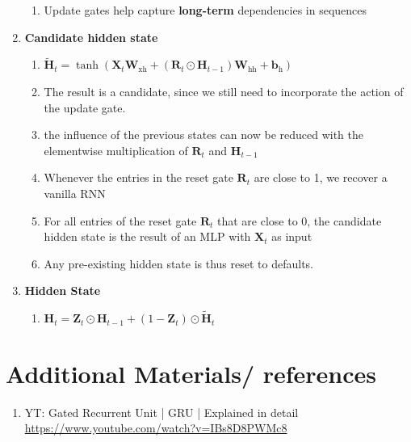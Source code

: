 \begin{enumerate}[itemsep=0.15cm]
\begin{enumerate}
        \item Update gates help capture \textbf{long-term} dependencies in sequences
    \end{enumerate}

    \item \textbf{Candidate hidden state}
    \begin{enumerate}
        \item $\tilde{\mathbf{H}}_t = \tanh(\mathbf{X}_t \mathbf{W}_{\textrm{xh}} + \left(\mathbf{R}_t \odot \mathbf{H}_{t-1}\right) \mathbf{W}_{\textrm{hh}} + \mathbf{b}_\textrm{h})$

        \item The result is a candidate, since we still need to incorporate the action of the update gate.

        \item the influence of the previous states can now be reduced with the elementwise multiplication of $\mathbf{R}_t$ and $\mathbf{H}_{t-1}$

        \item Whenever the entries in the reset gate $\mathbf{R}_t$ are close to 1, we recover a vanilla RNN

        \item For all entries of the reset gate $\mathbf{R}_t$ that are close to 0, the candidate hidden state is the result of an MLP with $\mathbf{X}_t$ as input

        \item Any pre-existing hidden state is thus reset to defaults.
    \end{enumerate}

    \item \textbf{Hidden State}
    \begin{enumerate}
        \item $\mathbf{H}_t = \mathbf{Z}_t \odot \mathbf{H}_{t-1}  + (1 - \mathbf{Z}_t) \odot \tilde{\mathbf{H}}_t$

    \end{enumerate}
\end{enumerate}











\section*{Additional Materials/ references}
\begin{enumerate}
    \item YT: Gated Recurrent Unit | GRU | Explained in detail\\
    \url{https://www.youtube.com/watch?v=IBs8D8PWMc8}

\end{enumerate}
